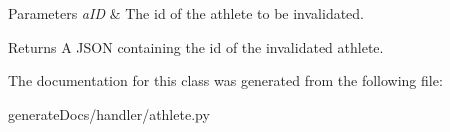 \begin{DoxyParams}{Parameters}
{\em a\+ID} & The id of the athlete to be invalidated. \\
\hline
\end{DoxyParams}
\begin{DoxyReturn}{Returns}
A J\+S\+ON containing the id of the invalidated athlete. 
\end{DoxyReturn}


The documentation for this class was generated from the following file\+:\begin{DoxyCompactItemize}
\item 
generate\+Docs/handler/athlete.\+py\end{DoxyCompactItemize}
